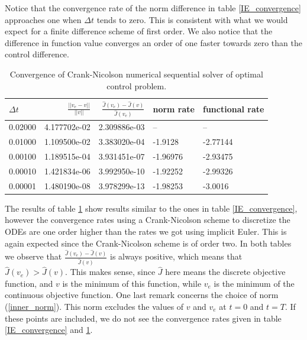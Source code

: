 Notice that the convergence rate of the norm difference in table \ref{IE_convergence} approaches one when $\Delta t$ tends to zero. This is consistent with what we would expect for a finite difference scheme of first order. We also notice that the difference in function value converges an order of one faster towards zero than the control difference.  
\begin{table}[!h]
\caption{Convergence of Crank-Nicolson numerical sequential solver of optimal control problem.}\label{CN_convergence}
\centering
\begin{tabular}{lrrll}
\toprule
{} $\Delta t$&    $\frac{||v_e-v||}{||v||}$ &  $\frac{\hat J(v_e)-\hat J(v)}{\hat J(v_e)}$ &   norm rate &    functional rate \\
\midrule
0.02000 &  4.177702e-02 &  2.309886e-03 &       -- &       -- \\
0.01000 &  1.109500e-02 &  3.383020e-04 &  -1.9128 & -2.77144 \\
0.00100 &  1.189515e-04 &  3.931451e-07 & -1.96976 & -2.93475 \\
0.00010 &  1.421834e-06 &  3.992950e-10 & -1.92252 & -2.99326 \\
0.00001 &  1.480190e-08 &  3.978299e-13 & -1.98253 &  -3.0016 \\
\bottomrule
\end{tabular}
\end{table}
The results of table \ref{CN_convergence} show results similar to the ones in table \ref{IE_convergence}, however the convergence rates using a Crank-Nicolson scheme to discretize the ODEs are one order higher than the rates we got using implicit Euler. This is again expected since the Crank-Nicolson scheme is of order two. In both tables we observe that $\frac{\hat J(v_e)-\hat J(v)}{\hat J(v)}$ is always positive, which means that $\hat J(v_e)>\hat J(v)$. This makes sense, since $\hat J$ here means the discrete objective function, and $v$ is the minimum of this function, while $v_e$ is the minimum of the continuous objective function. One last remark concerns the choice of norm (\ref{inner_norm}). This norm excludes the values of $v$ and $v_e$ at $t=0$ and $t=T$. If these points are included, we do not see the convergence rates given in table \ref{IE_convergence} and \ref{CN_convergence}. 
